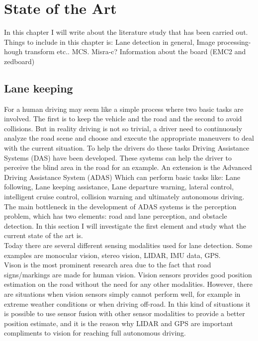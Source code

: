 \chapter{State of the Art}
In this chapter I will write about the literature study that has been carried out. Things to include in this chapter is: Lane detection in general, Image processing- hough transform etc.. MCS. Misra-c? Information about the board  (EMC2 and zedboard)

\section{Lane keeping}
For a human driving may seem like a simple process where two basic tasks are involved. The first is to keep the vehicle and the road and the second to avoid collisions. But in reality driving is not so trivial, a driver need to continuously analyze the road scene and choose and execute the appropriate maneuvers to deal with the current situation. To help the drivers do these tasks Driving Assistance Systems (DAS) have been developed. These systems can help the driver to perceive the blind area in the road for an example. An extension is the Advanced Driving Assistance System (ADAS) Which can perform basic tasks like: Lane following, Lane keeping assistance, Lane departure warning, lateral control, intelligent cruise control, collision warning and ultimately autonomous driving.\\

The main bottleneck in the development of ADAS systems is the perception problem, which has two elements: road and lane perception, and obstacle detection. In this section I will investigate the first element and study what the current state of the art is.\\

Today there are several different sensing modalities used for lane detection. Some examples are monocular vision, stereo vision, LIDAR, IMU data, GPS.\\


Vison is the most prominent research area due to the fact that road signs/markings are made for human vision. Vision sensors provides good position estimation on the road without the need for any other modalities. However, there are situations when vision sensors simply cannot perform well, for example in extreme weather conditions or when driving off-road. In this kind of situations it is possible to use sensor fusion with other sensor modalities to provide a better position estimate, and it is the reason why LIDAR and GPS are important compliments to vision for reaching full autonomous driving.\\




